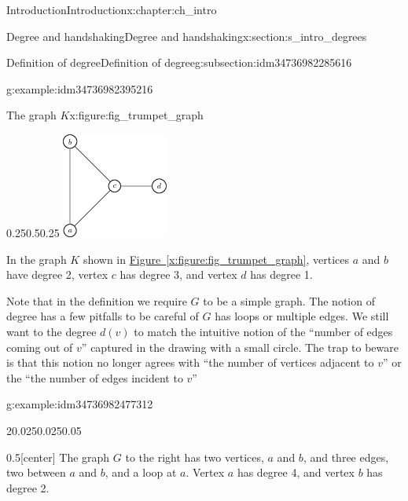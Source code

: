 \documentclass[oneside,10pt,]{book}
\newcommand{\xreffont}{\relax}
\numberwithin{equation}{section}
\begin{document}
\begin{chapterptx}{Introduction}{}{Introduction}{}{}{x:chapter:ch_intro}
\begin{sectionptx}{Degree and handshaking}{}{Degree and handshaking}{}{}{x:section:s_intro_degrees}
\begin{subsectionptx}{Definition of degree}{}{Definition of degree}{}{}{g:subsection:idm34736982285616}
\begin{example}{}{g:example:idm34736982395216}
\begin{figureptx}{The graph \(K\)}{x:figure:fig_trumpet_graph}{}
\begin{image}{0.25}{0.5}{0.25}
\includegraphics[width=\linewidth]{images/degreeexamplegraph.png}
\end{image}%
\tcblower
\end{figureptx}%
In the graph \(K\) shown in \hyperref[x:figure:fig_trumpet_graph]{Figure~{\xreffont\ref{x:figure:fig_trumpet_graph}}}, vertices \(a\) and \(b\) have degree 2, vertex \(c\) has degree 3, and vertex \(d\) has degree 1.%
\end{example}
Note that in the definition we require \(G\) to be a simple graph.  The notion of degree has a few pitfalls to be careful of \(G\) has loops or multiple edges.  We still want to the degree \(d(v)\) to match the intuitive notion of the ``number of edges coming out of \(v\)'' captured in the drawing with a small circle.  The trap to beware is that this notion no longer agrees with ``the number of vertices adjacent to \(v\)'' or the ``the number of edges incident to \(v\)''%
\begin{example}{}{g:example:idm34736982477312}%
\begin{sidebyside}{2}{0.025}{0.025}{0.05}%
\begin{sbspanel}{0.5}[center]%
The graph \(G\) to the right has two vertices, \(a\) and \(b\), and three edges, two between \(a\) and \(b\), and a loop at \(a\).  Vertex \(a\) has degree 4, and vertex \(b\) has degree 2.%
\end{sbspanel}%

\end{sidebyside}
\end{example}
\end{subsectionptx}
\end{sectionptx}
\end{chapterptx}
\end{document}
